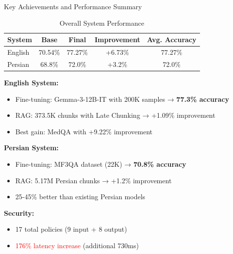 \begin{frame}{Key Achievements and Performance Summary}
    \begin{table}[h]
        \centering
        \footnotesize
        \caption{Overall System Performance}
        \begin{tabular}{lcccc}
            \toprule
            \textbf{System} & \textbf{Base} & \textbf{Final} & \textbf{Improvement} & \textbf{Avg. Accuracy} \\
            \midrule
            English & 70.54\% & 77.27\% & +6.73\% & 77.27\% \\
            Persian & 68.8\% & 72.0\% & +3.2\% & 72.0\% \\
            \bottomrule
        \end{tabular}
    \end{table}
    
    \textbf{English System:}
    \begin{itemize}
        \item Fine-tuning: Gemma-3-12B-IT with 200K samples → \textbf{77.3\% accuracy}
        \item RAG: 373.5K chunks with Late Chunking → +1.09\% improvement
        \item Best gain: MedQA with +9.22\% improvement
    \end{itemize}
    
    \textbf{Persian System:}
    \begin{itemize}
        \item Fine-tuning: MF3QA dataset (22K) → \textbf{70.8\% accuracy}
        \item RAG: 5.17M Persian chunks → +1.2\% improvement
        \item 25-45\% better than existing Persian models
    \end{itemize}
    
    \textbf{Security:}
    \begin{itemize}
        \item 17 total policies (9 input + 8 output)
        \item \textcolor{red}{176\% latency increase} (additional 730ms)
    \end{itemize}
\end{frame}

